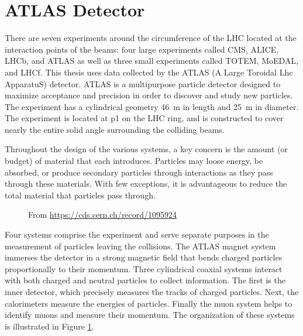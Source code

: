 \section{ATLAS Detector}
There are seven experiments around the circumference of the LHC located at the interaction points of the beams: four large experiments called CMS, ALICE, LHCb, and ATLAS as well as three small experiments called TOTEM, MoEDAL, and LHCf.
This thesis uses data collected by the ATLAS (A Large Toroidal Lhc ApparatuS) detector.
ATLAS is a multipurpose particle detector designed to maximize acceptance and precision in order to discover and study new particles.
The experiment has a cylindrical geometry 46~m in length and 25~m in diameter.
The experiment is located at p1 on the LHC ring, and is constructed to cover nearly the entire solid angle surrounding the colliding beams. \cite{atlasFacts}

Throughout the design of the various systems, a key concern is the amount (or budget) of material that each introduces.
Particles may loose energy, be absorbed, or produce secondary particles through interactions as they pass through these materials.
With few exceptions, it is advantageous to reduce the total material that particles pass through.

\begin{figure}[h!]
\captionsetup[subfigure]{position=b}
\centering
{}
\caption{From \url{https://cds.cern.ch/record/1095924}}
\label{fig:atlasLayout}
\end{figure}

Four systems comprise the experiment and serve separate purposes in the measurement of particles leaving the collisions.
The ATLAS magnet system immerses the detector in a strong magnetic field that bends charged particles proportionally to their momentum.
Three cylindrical coaxial systems interact with both charged and neutral particles to collect information.
The first is the inner detector, which precisely measures the tracks of charged particles.
Next, the calorimeters measure the energies of particles.
Finally the muon system helps to identify muons and measure their momentum.
The organization of these systems is illustrated in Figure \ref{fig:atlasLayout}.

